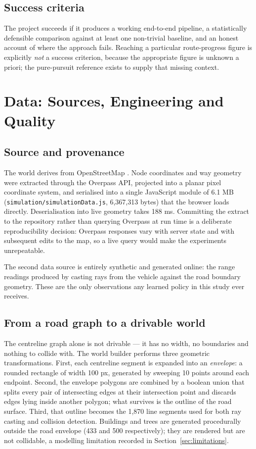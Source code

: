 \documentclass[conference]{IEEEtran}
\begin{document}
\subsection{Success criteria}

The project succeeds if it produces a working end-to-end pipeline, a statistically defensible comparison against at least one non-trivial baseline, and an honest account of where the approach fails. Reaching a particular route-progress figure is explicitly \emph{not} a success criterion, because the appropriate figure is unknown a priori; the pure-pursuit reference exists to supply that missing context.

\section{Data: Sources, Engineering and Quality}

\label{sec:data}

\subsection{Source and provenance}

The world derives from OpenStreetMap \cite{osm}. Node coordinates and way geometry were extracted through the Overpass API, projected into a planar pixel coordinate system, and serialised into a single JavaScript module of 6.1 MB (\texttt{simulation/simulationData.js}, 6,367,313 bytes) that the browser loads directly. Deserialisation into live geometry takes 188 ms. Committing the extract to the repository rather than querying Overpass at run time is a deliberate reproducibility decision: Overpass responses vary with server state and with subsequent edits to the map, so a live query would make the experiments unrepeatable.

The second data source is entirely synthetic and generated online: the range readings produced by casting rays from the vehicle against the road boundary geometry. These are the only observations any learned policy in this study ever receives.

\subsection{From a road graph to a drivable world}

The centreline graph alone is not drivable — it has no width, no boundaries and nothing to collide with. The world builder performs three geometric transformations. First, each centreline segment is expanded into an \emph{envelope}: a rounded rectangle of width 100 px, generated by sweeping 10 points around each endpoint. Second, the envelope polygons are combined by a boolean union that splits every pair of intersecting edges at their intersection point and discards edges lying inside another polygon; what survives is the outline of the road surface. Third, that outline becomes the 1,870 line segments used for both ray casting and collision detection. Buildings and trees are generated procedurally outside the road envelope (433 and 500 respectively); they are rendered but are not collidable, a modelling limitation recorded in Section~\ref{sec:limitations}.
\end{document}
